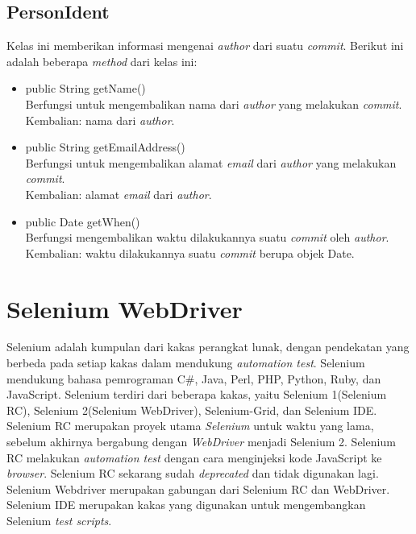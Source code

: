 \subsection{PersonIdent}
\label{subsec:personident}
Kelas ini memberikan informasi mengenai \textit{author} dari suatu \textit{commit}. Berikut ini adalah beberapa \textit{method} dari kelas ini:
\begin{itemize}
\item public String getName()\\
Berfungsi untuk mengembalikan nama dari \textit{author} yang melakukan \textit{commit}.\\
Kembalian: nama dari \textit{author}.

\item public String getEmailAddress()\\
Berfungsi untuk mengembalikan alamat \textit{email} dari \textit{author} yang melakukan \textit{commit}.\\
Kembalian: alamat \textit{email} dari \textit{author}.

\item public Date getWhen()\\
Berfungsi mengembalikan waktu dilakukannya suatu \textit{commit} oleh \textit{author}.\\
Kembalian: waktu dilakukannya suatu \textit{commit} berupa objek Date.
\end{itemize}


\section{Selenium WebDriver}
\label{sec:selenium_webdriver}
Selenium adalah kumpulan dari kakas perangkat lunak, dengan pendekatan yang berbeda pada setiap kakas dalam mendukung \textit{automation test}\cite{Selenium_doc}. Selenium mendukung bahasa pemrograman C\#, Java, Perl, PHP, Python, Ruby, dan JavaScript. Selenium terdiri dari beberapa kakas, yaitu Selenium 1(Selenium RC), Selenium 2(Selenium WebDriver), Selenium-Grid, dan Selenium IDE. Selenium RC merupakan proyek utama \textit{Selenium} untuk waktu yang lama, sebelum akhirnya bergabung dengan \textit{WebDriver} menjadi Selenium 2. Selenium RC melakukan \textit{automation test} dengan cara menginjeksi kode JavaScript ke \textit{browser}. Selenium RC sekarang sudah \textit{deprecated} dan tidak digunakan lagi. Selenium Webdriver merupakan gabungan dari Selenium RC dan WebDriver. Selenium IDE merupakan kakas yang digunakan untuk mengembangkan Selenium \textit{test scripts}.

